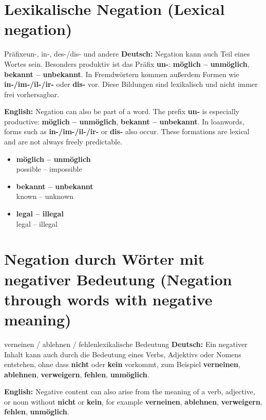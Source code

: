 \documentclass[a4paper,11pt]{article}
\newcommand{\GermanText}[1]{\textbf{Deutsch: }#1\par}
\newcommand{\EnglishText}[1]{{\small\color{SoftGray}\textbf{English: }#1\par}}
\newcommand{\ExampleItem}[2]{\item \textbf{#1}\\{\small\color{SoftGray}#2}}
\begin{document}
\section{Lexikalische Negation \textnormal{(Lexical negation)}}
\begin{grammarentry}{Präfixe}{un-, in-, des-/dis- und andere}
\GermanText{Negation kann auch Teil eines Wortes sein. Besonders produktiv ist das Präfix \textbf{un-}: \textbf{möglich -- unmöglich}, \textbf{bekannt -- unbekannt}. In Fremdwörtern kommen außerdem Formen wie \textbf{in-/im-/il-/ir-} oder \textbf{dis-} vor. Diese Bildungen sind lexikalisch und nicht immer frei vorhersagbar.}
\EnglishText{Negation can also be part of a word. The prefix \textbf{un-} is especially productive: \textbf{möglich -- unmöglich}, \textbf{bekannt -- unbekannt}. In loanwords, forms such as \textbf{in-/im-/il-/ir-} or \textbf{dis-} also occur. These formations are lexical and are not always freely predictable.}
\end{grammarentry}
\begin{exbox}\begin{itemize}
\ExampleItem{möglich -- unmöglich}{possible -- impossible}
\ExampleItem{bekannt -- unbekannt}{known -- unknown}
\ExampleItem{legal -- illegal}{legal -- illegal}
\end{itemize}\end{exbox}

\section{Negation durch Wörter mit negativer Bedeutung \textnormal{(Negation through words with negative meaning)}}
\begin{grammarentry}{verneinen / ablehnen / fehlen}{lexikalische Bedeutung}
\GermanText{Ein negativer Inhalt kann auch durch die Bedeutung eines Verbs, Adjektivs oder Nomens entstehen, ohne dass \textbf{nicht} oder \textbf{kein} vorkommt, zum Beispiel \textbf{verneinen}, \textbf{ablehnen}, \textbf{verweigern}, \textbf{fehlen}, \textbf{unmöglich}.}
\EnglishText{Negative content can also arise from the meaning of a verb, adjective, or noun without \textbf{nicht} or \textbf{kein}, for example \textbf{verneinen}, \textbf{ablehnen}, \textbf{verweigern}, \textbf{fehlen}, \textbf{unmöglich}.}
\end{grammarentry}
\end{document}
